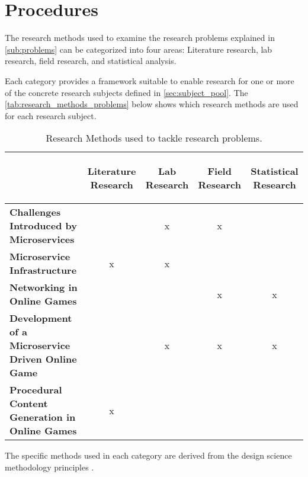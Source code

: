 \section{Procedures}

The research methods used to examine the research problems explained in
\autoref{sub:problems} can be categorized into four areas: Literature
research, lab research, field research, and statistical analysis.

Each category provides a framework suitable to enable research for one or more
of the concrete research subjects defined in \autoref{sec:subject_pool}. The
\autoref{tab:research_methods_problems} below shows which research methods are
used for each research subject.

\begin{table}

	\begin{center}
	  \begin{tabular}{ l | c | c | c | c | }
	  
	  	&\begin{turn}{90}\textbf{Literature Research}\end{turn}
	  	&\begin{turn}{90}\textbf{Lab Research}\end{turn}
	  	&\begin{turn}{90}\textbf{Field Research}\end{turn}
	  	&\begin{turn}{90}\textbf{Statistical Research}\end{turn}
	  	\\\hline
	    
	    \textbf{Challenges Introduced by Microservices}&&x&x&\\\hline
	    \textbf{Microservice Infrastructure}&x&x&&\\\hline
	    \textbf{Networking in Online Games}&&&x&x\\\hline
	    \textbf{Development of a Microservice Driven Online Game}&&x&x&x\\\hline
	    \textbf{Procedural Content Generation in Online Games}&x&&&\\\hline
	  \end{tabular}
	\end{center}
	\caption{Research Methods used to tackle research problems.}
	\label{tab:research_methods_problems}
\end{table}
The specific methods used in each category are derived from the design
science methodology principles \cite{wieringa2014design_science}.

